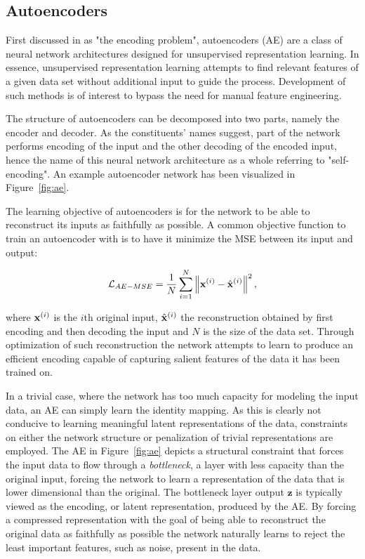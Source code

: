 \subsection{Autoencoders}
\label{subsection:autoencoders}

First discussed in \cite{encoding_problem} as "the encoding problem", autoencoders (AE) are a class of neural network architectures designed for unsupervised representation learning. In essence, unsupervised representation learning attempts to find relevant features of a given data set without additional input to guide the process. Development of such methods is of interest to bypass the need for manual feature engineering.

The structure of autoencoders can be decomposed into two parts, namely the encoder and decoder. As the constituents' names suggest, part of the network performs encoding of the input and the other decoding of the encoded input, hence the name of this neural network architecture as a whole referring to "self-encoding". An example autoencoder network has been visualized in Figure~\ref{fig:ae}.

The learning objective of autoencoders is for the network to be able to reconstruct its inputs as faithfully as possible. A common objective function to train an autoencoder with is to have it minimize the MSE between its input and output:

\begin{equation}
  \mathcal{L}_{AE-MSE} = \frac{1}{N} \sum_{i=1}^{N} \left\lVert\mathbf{x}^{(i)} - \hat{\mathbf{x}}^{(i)}\right\rVert^2,
  \label{eq:mse}
\end{equation}

where $\mathbf{x}^{(i)}$ is the $i$th original input, $\hat{\mathbf{x}}^{(i)}$ the reconstruction obtained by first encoding and then decoding the input and $N$ is the size of the data set. Through optimization of such reconstruction the network attempts to learn to produce an efficient encoding capable of capturing salient features of the data it has been trained on.

In a trivial case, where the network has too much capacity for modeling the input data, an AE can simply learn the identity mapping. As this is clearly not conducive to learning meaningful latent representations of the data, constraints on either the network structure or penalization of trivial representations are employed. The AE in Figure~\ref{fig:ae} depicts a structural constraint that forces the input data to flow through a \textit{bottleneck}, a layer with less capacity than the original input, forcing the network to learn a representation of the data that is lower dimensional than the original. The bottleneck layer output $\mathbf{z}$ is typically viewed as the encoding, or latent representation, produced by the AE. By forcing a compressed representation with the goal of being able to reconstruct the original data as faithfully as possible the network naturally learns to reject the least important features, such as noise, present in the data.

